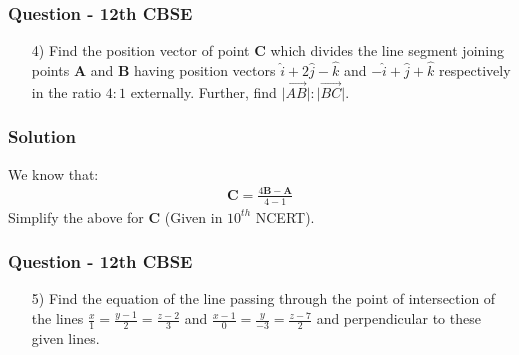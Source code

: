 \documentclass{beamer}
\begin{document}
\begin{frame}
\frametitle{Question - 12th CBSE}
\begin{enumerate}
    \item [4)]
Find the position vector of point $\textbf{C}$ which divides the line segment joining points $\textbf{A}$ and $\textbf{B}$ having position vectors $\hat{i} + 2\hat{j} - \hat{k}$ and $-\hat{i} + \hat{j} + \hat{k}$ respectively in the ratio $4:1$ externally. Further, find $\lvert \overrightarrow{AB}\rvert : \lvert \overrightarrow{BC} \rvert$. 
    \end{enumerate}
\end{frame}





\begin{frame}
\frametitle{Solution}
We know that:
\begin{align}
\textbf{C} = \frac{4\textbf{B}-\textbf{A}}{4-1}
\end{align}
Simplify the above for \textbf{C} (Given in $10^{th}$ NCERT).
    
\end{frame}









\begin{frame}
\frametitle{Question - 12th CBSE}
\begin{enumerate}
    \item [5)]
Find the equation of the line passing through the point of intersection of the lines $\frac{x}{1} = \frac{y-1}{2} = \frac{z-2}{3}$ and $\frac{x-1}{0} = \frac{y}{-3} = \frac{z-7}{2}$ and perpendicular to these given lines. 
\end{enumerate}
\end{frame}
\end{document}
